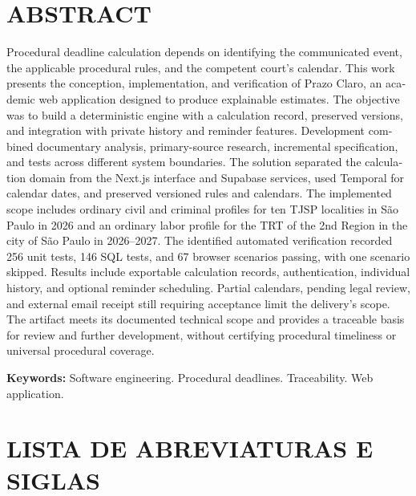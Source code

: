 \documentclass[12pt,a4paper,oneside]{report}
\newcommand{\listquadros}{\listof{quadro}{LISTA DE QUADROS}}
\begin{document}
\chapter*{ABSTRACT}\thispagestyle{empty}
\begin{otherlanguage}{english}\begin{singlespace}\noindent Procedural deadline calculation depends on identifying the communicated event, the applicable procedural rules, and the competent court's calendar. This work presents the conception, implementation, and verification of Prazo Claro, an academic web application designed to produce explainable estimates. The objective was to build a deterministic engine with a calculation record, preserved versions, and integration with private history and reminder features. Development combined documentary analysis, primary-source research, incremental specification, and tests across different system boundaries. The solution separated the calculation domain from the Next.js interface and Supabase services, used Temporal for calendar dates, and preserved versioned rules and calendars. The implemented scope includes ordinary civil and criminal profiles for ten TJSP localities in São Paulo in 2026 and an ordinary labor profile for the TRT of the 2nd Region in the city of São Paulo in 2026--2027. The identified automated verification recorded 256 unit tests, 146 SQL tests, and 67 browser scenarios passing, with one scenario skipped. Results include exportable calculation records, authentication, individual history, and optional reminder scheduling. Partial calendars, pending legal review, and external email receipt still requiring acceptance limit the delivery's scope. The artifact meets its documented technical scope and provides a traceable basis for review and further development, without certifying procedural timeliness or universal procedural coverage.\par\medskip
\noindent\textbf{Keywords:} Software engineering. Procedural deadlines. Traceability. Web application.
\end{singlespace}\end{otherlanguage}
\clearpage\listoffigures\thispagestyle{empty}
\clearpage\listquadros\thispagestyle{empty}
\clearpage\listoftables\thispagestyle{empty}
\clearpage\chapter*{LISTA DE ABREVIATURAS E SIGLAS}\thispagestyle{empty}
\end{document}
